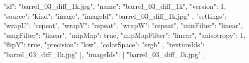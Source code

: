 {
  "id": "barrel_03_diff_1k.jpg",
  "name": "barrel_03_diff_1k",
  "version": 1,
  "source": {
    "kind": "image",
    "imageId": "barrel_03_diff_1k.jpg"
  },
  "settings": {
    "wrapU": "repeat",
    "wrapV": "repeat",
    "wrapW": "repeat",
    "minFilter": "linear",
    "magFilter": "linear",
    "mipMap": true,
    "mipMapFilter": "linear",
    "anisotropy": 1,
    "flipY": true,
    "precision": "low",
    "colorSpace": "srgb"
  },
  "textureIds": [
    "barrel_03_diff_1k.jpg"
  ],
  "imageIds": [
    "barrel_03_diff_1k.jpg"
  ]
}
